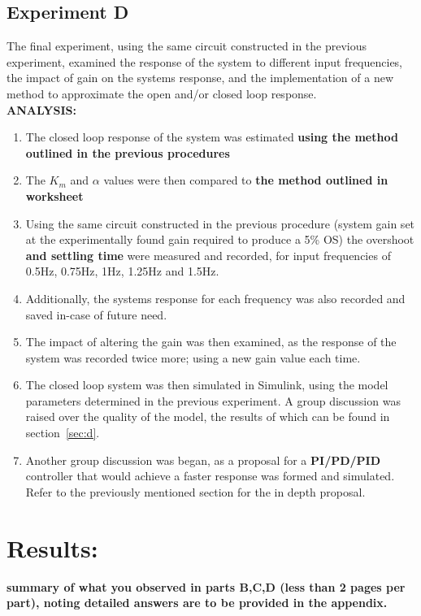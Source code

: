 \documentclass[11pt,a4paper]{article}
\begin{document}
\pagebreak
\subsection{Experiment D}
The final experiment, using the same circuit constructed in the previous experiment, examined the response of the system to different input frequencies, the impact of gain on the systems response, and the implementation of a new method to approximate the open and/or closed loop response. \\

\textbf{ANALYSIS:}
\begin{enumerate}
	\item The closed loop response of the system was estimated \textbf{using the method outlined in the previous procedures}
	\item The $K_m$ and $\alpha$ values were then compared to \textbf{the method outlined in worksheet}
	\item Using the same circuit constructed in the previous procedure (system gain set at the experimentally found gain required to produce a 5\% OS) the overshoot \textbf{and settling time} were measured and recorded, for input frequencies of 0.5Hz, 0.75Hz, 1Hz, 1.25Hz and 1.5Hz. 
	\item Additionally, the systems response for each frequency was also recorded and saved in-case of future need.
	\item The impact of altering the gain was then examined, as the response of the system was recorded twice more; using a new gain value each time.
	\item The closed loop system was then simulated in Simulink, using the model parameters determined in the previous experiment. A group discussion was raised over the quality of the model, the results of which can be found in section~\ref{sec:d}.
	\item Another group discussion was began, as a proposal for a \textbf{PI/PD/PID} controller that would achieve a faster response was formed and simulated. Refer to the previously mentioned section for the in depth proposal.
\end{enumerate}








\pagebreak
\section{Results:}
\textbf{summary of what you observed in parts B,C,D (less than 2 pages per part), noting detailed answers are to be provided in the appendix.}
\end{document}
